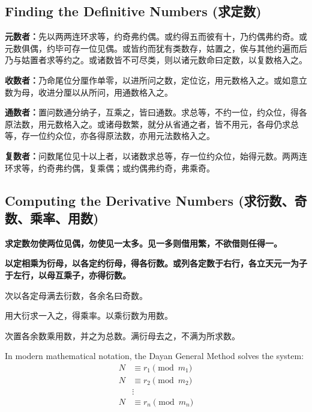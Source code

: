 \documentclass[11pt,a4paper]{article}
\newcommand{\zhtext}[1]{{\chinese #1}}
\begin{document}
\subsection{Finding the Definitive Numbers (\zhtext{求定数})}

\textbf{元数者：}\zhtext{先以两两连环求等，约奇弗约偶。或约得五而彼有十，乃约偶弗约奇。或元数俱偶，约毕可存一位见偶。或皆约而犹有类数存，姑置之，俟与其他约遍而后乃与姑置者求等约之。或诸数皆不可尽类，则以诸元数命曰定数，以复数格入之。}

\textbf{收数者：}\zhtext{乃命尾位分厘作单零，以进所问之数，定位讫，用元数格入之。或如意立数为母，收进分厘以从所问，用通数格入之。}

\textbf{通数者：}\zhtext{置问数通分纳子，互乘之，皆曰通数。求总等，不约一位，约众位，得各原法数，用元数格入之。或诸母数繁，就分从省通之者，皆不用元，各母仍求总等，存一位约众位，亦各得原法数，亦用元法数格入之。}

\textbf{复数者：}\zhtext{问数尾位见十以上者，以诸数求总等，存一位约众位，始得元数。两两连环求等，约奇弗约偶，复乘偶；或约偶弗约奇，弗乘奇。}

\subsection{Computing the Derivative Numbers (\zhtext{求衍数、奇数、乘率、用数})}

\textbf{\zhtext{求定数}勿使两位见偶，勿使见一太多。见一多则借用繁，不欲借则任得一。}

\textbf{\zhtext{以定相乘为衍母}，以各定约衍母，得各衍数。或列各定数于右行，各立天元一为子于左行，以母互乘子，亦得衍数。}

\zhtext{次以各定母满去衍数，各余名曰奇数。}

\zhtext{用大衍求一入之，得乘率。以乘衍数为用数。}

\zhtext{次置各余数乘用数，并之为总数。满衍母去之，不满为所求数。}

In modern mathematical notation, the Dayan General Method solves the system:
\begin{align*}
N &\equiv r_1 \pmod{m_1} \\
N &\equiv r_2 \pmod{m_2} \\
&\vdots \\
N &\equiv r_n \pmod{m_n}
\end{align*}
\end{document}
